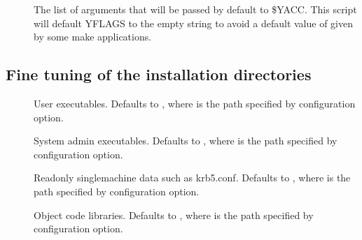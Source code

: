 \documentclass[letterpaper,10pt,english]{sphinxmanual}
\begin{document}
\begin{description}
\item[{}] \leavevmode
\sphinxAtStartPar
The list of arguments that will be passed by default to \$YACC.
This script will default YFLAGS to the empty string to avoid a
default value of  given by some make applications.

\end{description}


\subsection{Fine tuning of the installation directories}
\label{\detokenize{build/options2configure:fine-tuning-of-the-installation-directories}}\begin{description}
\item[{\sphinxstylestrong{\sphinxhyphen{}}}] \leavevmode
\sphinxAtStartPar
User executables.  Defaults to , where
 is the path specified by \sphinxstylestrong{\sphinxhyphen{}}
configuration option.

\item[{\sphinxstylestrong{\sphinxhyphen{}}}] \leavevmode
\sphinxAtStartPar
System admin executables.  Defaults to , where
 is the path specified by \sphinxstylestrong{\sphinxhyphen{}}
configuration option.

\item[{\sphinxstylestrong{\sphinxhyphen{}}}] \leavevmode
\sphinxAtStartPar
Read\sphinxhyphen{}only single\sphinxhyphen{}machine data such as krb5.conf.
Defaults to , where
 is the path specified by \sphinxstylestrong{\sphinxhyphen{}} configuration
option.

\item[{\sphinxstylestrong{\sphinxhyphen{}}}] \leavevmode
\sphinxAtStartPar
Object code libraries.  Defaults to , where
 is the path specified by \sphinxstylestrong{\sphinxhyphen{}}
configuration option.


\end{description}
\end{document}
